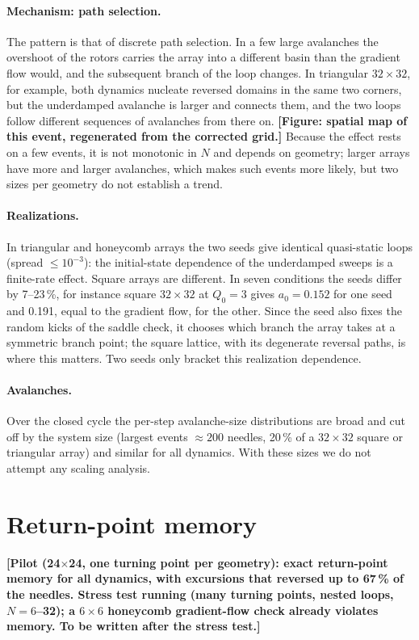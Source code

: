 \documentclass[pre,twocolumn,superscriptaddress,showpacs,floatfix]{revtex4-2}
\newcommand{\todo}[1]{\textcolor{red!70!black}{\textbf{[#1]}}}
\begin{document}
\paragraph{Mechanism: path selection.} The pattern is that of discrete path selection. In a few large avalanches the overshoot of the rotors carries the array into a different basin than the gradient flow would, and the subsequent branch of the loop changes. In triangular $32\times32$, for example, both dynamics nucleate reversed domains in the same two corners, but the underdamped avalanche is larger and connects them, and the two loops follow different sequences of avalanches from there on. \todo{Figure: spatial map of this event, regenerated from the corrected grid.} Because the effect rests on a few events, it is not monotonic in $N$ and depends on geometry; larger arrays have more and larger avalanches, which makes such events more likely, but two sizes per geometry do not establish a trend.

\paragraph{Realizations.} In triangular and honeycomb arrays the two seeds give identical quasi-static loops (spread $\le10^{-3}$): the initial-state dependence of the underdamped sweeps is a finite-rate effect. Square arrays are different. In seven conditions the seeds differ by 7--23\,\%, for instance square $32\times32$ at $Q_0=3$ gives $a_0=0.152$ for one seed and 0.191, equal to the gradient flow, for the other. Since the seed also fixes the random kicks of the saddle check, it chooses which branch the array takes at a symmetric branch point; the square lattice, with its degenerate reversal paths, is where this matters. Two seeds only bracket this realization dependence.

\paragraph{Avalanches.} Over the closed cycle the per-step avalanche-size distributions are broad and cut off by the system size (largest events $\approx200$ needles, 20\,\% of a $32\times32$ square or triangular array) and similar for all dynamics. With these sizes we do not attempt any scaling analysis.

\section{Return-point memory}
\label{sec:rpm}
\todo{Pilot (24$\times$24, one turning point per geometry): exact return-point memory for all dynamics, with excursions that reversed up to 67\,\% of the needles. Stress test running (many turning points, nested loops, $N=6$--32); a $6\times6$ honeycomb gradient-flow check already violates memory. To be written after the stress test.}
\end{document}
